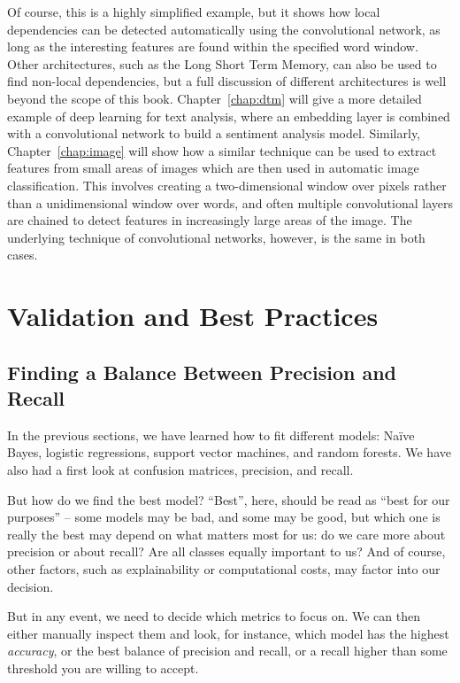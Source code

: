 Of course, this is a highly simplified example, but it shows how local dependencies can be detected automatically using the convolutional network, as long as the interesting features are found within the specified word window.
Other architectures, such as the Long Short Term Memory, can also be used to find non-local dependencies, but a full discussion of different architectures is well beyond the scope of this book.
Chapter~\ref{chap:dtm} will give a more detailed example of deep learning for text analysis, where an embedding layer is combined with a convolutional network to build a sentiment analysis model.
Similarly, Chapter~\ref{chap:image} will show how a similar technique can be used to extract features from small areas of images which are then used in automatic image classification.
This involves creating a two-dimensional window over pixels rather than a unidimensional window over words, and often multiple convolutional layers are chained to detect features in increasingly large areas of the image.
The underlying technique of convolutional networks, however, is the same in both cases.

%
\section{Validation and Best Practices} \label{sec:validation}
\subsection{Finding a Balance Between Precision and Recall} \label{sec:balance}

In the previous sections, we have learned how to fit different models:
Na\"ive Bayes, logistic regressions, support vector machines, and
random forests.  We have also had a first look at confusion matrices,
precision, and recall.

But how do we find the best model? ``Best'', here, should be read as
``best for our purposes'' -- some models may be bad, and some may be
good, but which one is really the best may depend on what matters most
for us: do we care more about precision or about recall? Are all
classes equally important to us?  And of course, other factors, such
as explainability or computational costs, may factor into our decision.

But in any event, we need to decide which metrics to focus on.  We can
then either manually inspect them and look, for instance, which model
has the highest \emph{accuracy}, or the best balance of precision and recall,
or a recall higher than some threshold you are willing to accept.

